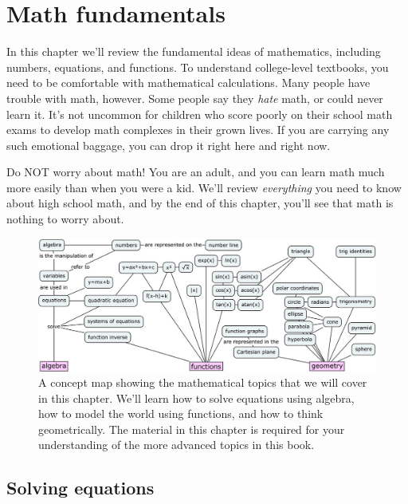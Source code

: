 
%
%

\chapter{Math fundamentals}
\label{chapter:math_fundamentals}

In this chapter we'll review the fundamental ideas of mathematics, including numbers, equations, and functions.  
To understand college-level textbooks, you need to be comfortable with mathematical calculations.
Many people have trouble with math, however. 
Some people say they \emph{hate} math, or could never learn it. 
It's not uncommon for children who score poorly on their school math exams to develop math complexes in their grown lives.
If you are carrying any such emotional baggage, you can drop it right here and right now.

Do NOT worry about math! 
You are an adult, and you can learn math much more easily than when you were a kid.
We'll review \emph{everything} you need to know about high school math, and by the end of this chapter, 
you'll see that math is nothing to worry about.

\smallskip

\begin{figure}[H]
\centering
\! \includegraphics[width=1.01\textwidth]{images/figures/concept_maps/precalculus.jpg}
	\caption{A concept map showing the mathematical topics that we will cover in this chapter.
			We'll learn how to solve equations using algebra, 
			how to model the world using functions,
			and how to think geometrically.
			The material in this chapter is required for your understanding of the more advanced topics in this book.\label{fig:precalculus_concept_map}}

\end{figure}

\section{Solving equations}
\label{sec:solving_equations}
	
